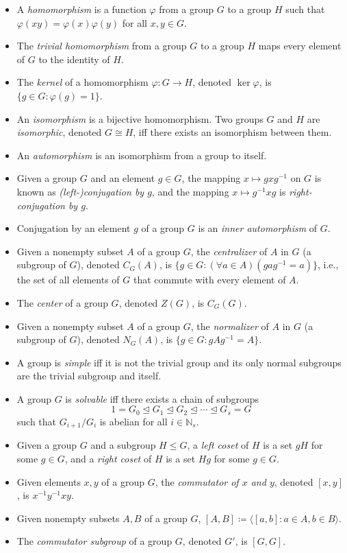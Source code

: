\documentclass{article}
\newcommand{\N}{\mathbb{N}}
\newcommand{\gen}[1]{\langle #1\rangle}
\newcommand{\normaleq}{\trianglelefteq}
\begin{document}
\begin{itemize}
\item A \emph{homomorphism} is a function $\varphi$ from a group $G$ to a group $H$ such that $\varphi(xy) = \varphi(x)\varphi(y)$ for all $x,y\in G$.
\item The \emph{trivial homomorphism} from a group $G$ to a group $H$ maps every element of $G$ to the identity of $H$.
\item The \emph{kernel} of a homomorphism $\varphi\colon G\to H$, denoted $\ker\varphi$, is $\{g\in G : \varphi(g) = 1\}$.
\item An \emph{isomorphism} is a bijective homomorphism.  Two groups $G$ and $H$ are \emph{isomorphic}, denoted $G\cong H$, iff there exists an isomorphism between them.
\item An \emph{automorphism} is an isomorphism from a group to itself.

\item Given a group $G$ and an element $g\in G$, the mapping $x\mapsto gxg^{-1}$ on $G$ is known as \emph{(left-)conjugation by $g$}, and the mapping $x\mapsto g^{-1}xg$ is \emph{right-conjugation by $g$}.
\item Conjugation by an element $g$ of a group $G$ is an \emph{inner automorphism} of $G$.

\item Given a nonempty subset $A$ of a group $G$, the \emph{centralizer} of $A$ in $G$ (a subgroup of $G$), denoted $C_G(A)$, is $\{g\in G : (\forall a\in A)(gag^{-1} = a)\}$, i.e., the set of all elements of $G$ that commute with every element of $A$.
\item The \emph{center} of a group $G$, denoted $Z(G)$, is $C_G(G)$.
\item Given a nonempty subset $A$ of a group $G$, the \emph{normalizer} of $A$ in $G$ (a subgroup of $G$), denoted $N_G(A)$, is $\{g\in G : gAg^{-1} = A\}$.
\item A group is \emph{simple} iff it is not the trivial group and its only normal subgroups are the trivial subgroup and itself.
\item A group $G$ is \emph{solvable} iff there exists a chain of subgroups $$1 = G_0\normaleq G_1\normaleq G_2\normaleq\cdots\normaleq G_s = G$$ such that $G_{i+1}/G_i$ is abelian for all $i\in\N_s$.
\item Given a group $G$ and a subgroup $H\leq G$, a \emph{left coset} of $H$ is a set $gH$ for some $g\in G$, and a \emph{right coset} of $H$ is a set $Hg$ for some $g\in G$.

\item Given elements $x,y$ of a group $G$, the \emph{commutator of $x$ and $y$}, denoted $[x,y]$, is $x^{-1}y^{-1}xy$.
\item Given nonempty subsets $A,B$ of a group $G$, $[A,B] \coloneqq \gen{[a,b] : a\in A, b\in B}$.
\item The \emph{commutator subgroup} of a group $G$, denoted $G'$, is $[G,G]$.


\end{itemize}
\end{document}
